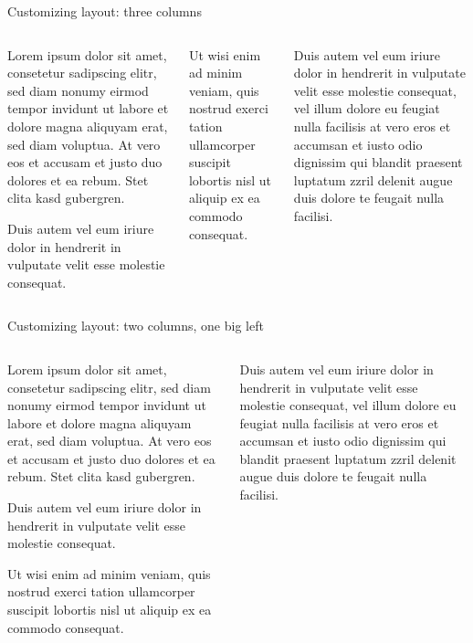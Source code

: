 \documentclass[10pt,english,ignorenonframetext,]{beamer}
\begin{document}
\begin{frame}{Customizing layout: three columns}

\begin{columns}[T]
	\begin{column}[t]{0.33\textwidth}

Lorem ipsum dolor sit amet, consetetur sadipscing elitr, sed diam nonumy
eirmod tempor invidunt ut labore et dolore magna aliquyam erat, sed diam
voluptua. At vero eos et accusam et justo duo dolores et ea rebum. Stet
clita kasd gubergren.

Duis autem vel eum iriure dolor in hendrerit in vulputate velit esse
molestie consequat.

	\end{column}
	\begin{column}[t]{0.33\textwidth}

Ut wisi enim ad minim veniam, quis nostrud exerci tation ullamcorper
suscipit lobortis nisl ut aliquip ex ea commodo consequat.

	\end{column}
	\begin{column}[t]{0.33\textwidth}

Duis autem vel eum iriure dolor in hendrerit in vulputate velit esse
molestie consequat, vel illum dolore eu feugiat nulla facilisis at vero
eros et accumsan et iusto odio dignissim qui blandit praesent luptatum
zzril delenit augue duis dolore te feugait nulla facilisi.

	\end{column}
\end{columns}

\end{frame}

\begin{frame}{Customizing layout: two columns, one big left}

\begin{columns}[T]
	\begin{column}[t]{0.66\textwidth}

Lorem ipsum dolor sit amet, consetetur sadipscing elitr, sed diam nonumy
eirmod tempor invidunt ut labore et dolore magna aliquyam erat, sed diam
voluptua. At vero eos et accusam et justo duo dolores et ea rebum. Stet
clita kasd gubergren.

Duis autem vel eum iriure dolor in hendrerit in vulputate velit esse
molestie consequat.

Ut wisi enim ad minim veniam, quis nostrud exerci tation ullamcorper
suscipit lobortis nisl ut aliquip ex ea commodo consequat.

	\end{column}
	\begin{column}[t]{0.33\textwidth}

Duis autem vel eum iriure dolor in hendrerit in vulputate velit esse
molestie consequat, vel illum dolore eu feugiat nulla facilisis at vero
eros et accumsan et iusto odio dignissim qui blandit praesent luptatum
zzril delenit augue duis dolore te feugait nulla facilisi.

	\end{column}
\end{columns}

\end{frame}
\end{document}
